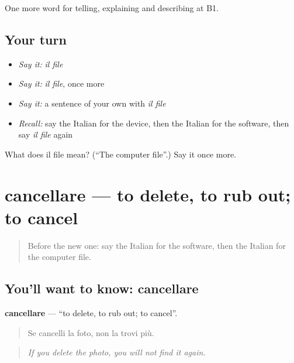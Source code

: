 \begin{grammarlens}[title={What you've built}]
One more word for telling, explaining and describing at B1.
\end{grammarlens}

\subsection*{Your turn}
\begin{itemize}
\raggedright
  \item \emph{Say it:} \emph{il file}
  \item \emph{Say it:} \emph{il file}, once more
  \item \emph{Say it:} a sentence of your own with \emph{il file}
  \item \emph{Recall:} say the Italian for the device, then the Italian for the software, then say \emph{il file} again
\end{itemize}

\begin{tcolorbox}[breakable,colback=teal!4,colframe=teal!35!black,title={Before you move on}]
What does il file mean? (\textquotedblleft{}The computer file\textquotedblright{}.) Say it once more.
\end{tcolorbox}
\section[cancellare]{cancellare — to delete, to rub out; to cancel}

\label{lesson:IT-C401-cancellare}



\begin{quote}
Before the new one: say the Italian for the software, then the Italian for the computer file.
\end{quote}

\subsection*{You'll want to know: cancellare}
\textbf{cancellare} — \textquotedblleft{}to delete, to rub out; to cancel\textquotedblright{}.

\begin{quote}
Se cancelli la foto, non la trovi più.
\end{quote}

\begin{quote}
\emph{If you delete the photo, you will not find it again.}
\end{quote}

